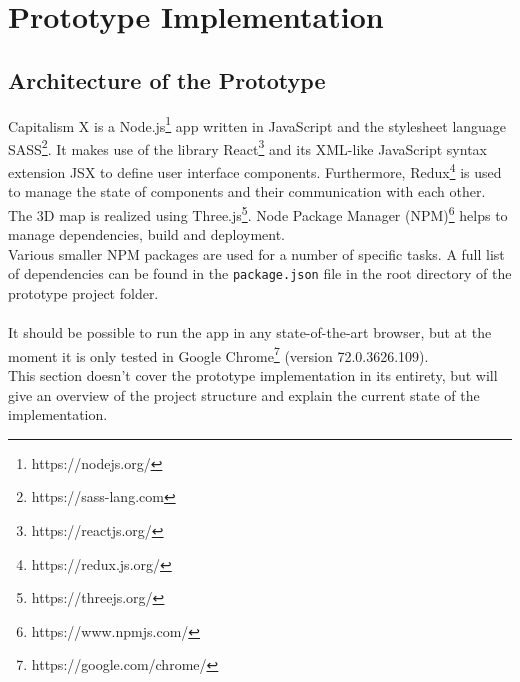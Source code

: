 \section{Prototype Implementation}
\subsection{Architecture of the Prototype}

Capitalism X is a Node.js\footnote{https://nodejs.org/} app written in JavaScript and the stylesheet language SASS\footnote{https://sass-lang.com}. It makes use of the library React\footnote{https://reactjs.org/} and its XML-like JavaScript syntax extension JSX to define user interface components. Furthermore, Redux\footnote{https://redux.js.org/} is used to manage the state of components and their communication with each other. The 3D map is realized using Three.js\footnote{https://threejs.org/}. Node Package Manager (NPM)\footnote{https://www.npmjs.com/} helps to manage dependencies, build and deployment.
\\
Various smaller NPM packages are used for a number of specific tasks. A full list of dependencies can be found in the \texttt{package.json} file in the root directory of the prototype project folder.\\\\
It should be possible to run the app in any state-of-the-art browser, but at the moment it is only tested in Google Chrome\footnote{https://google.com/chrome/} (version 72.0.3626.109).
\\
This section doesn't cover the prototype implementation in its entirety, but will give an overview of the project structure and explain the current state of the implementation.

